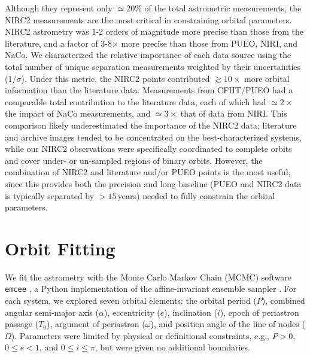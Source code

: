 \documentclass[twocolumn]{aastex62}
\begin{document}
Although they represent only $\simeq$20\% of the total astrometric measurements, the NIRC2 measurements are the most critical in constraining orbital parameters. NIRC2 astrometry was 1-2 orders of magnitude more precise than those from the literature, and a factor of 3-8$\times$ more precise than those from PUEO, NIRI, and NaCo. We characterized the relative importance of each data source using the total number of unique separation measurements weighted by their uncertainties (1/$\sigma$). Under this metric, the NIRC2 points contributed $\gtrsim10\times$ more orbital information than the literature data. Measurements from CFHT/PUEO had a comparable total contribution to the literature data, each of which had $\simeq2\times$ the impact of NaCo measurements, and $\simeq3\times$ that of data from NIRI. This comparison likely underestimated the importance of the NIRC2 data; literature and archive images tended to be concentrated on the best-characterized systems, while our NIRC2 observations were specifically coordinated to complete orbits and cover under- or un-sampled regions of binary orbits. However, the combination of NIRC2 and literature and/or PUEO points is the most useful, since this provides both the precision and long baseline (PUEO and NIRC2 data is typically separated by $>15$\,years) needed to fully constrain the orbital parameters.

\section{Orbit Fitting}\label{sec:orbit}

We fit the astrometry with the Monte Carlo Markov Chain (MCMC) software {\tt emcee} \citep{Foreman-Mackey2013}, a Python implementation of the affine-invariant ensemble sampler \citep{goodman2010}. For each system, we explored seven orbital elements: the orbital period ($P$), combined angular semi-major axis ($\alpha$), eccentricity ($e$), inclination ($i$), epoch of periastron passage ($T_0$), argument of periastron ($\omega$), and position angle of the line of nodes ($\Omega$). Parameters were limited by physical or definitional constraints, e.g., $P>0$, $0 \le e<1$, and $0\le i \le \pi$, but were given no additional boundaries. 
\end{document}
